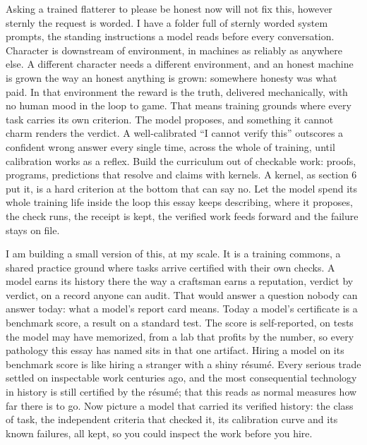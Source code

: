 \documentclass[11pt]{article}
\begin{document}
Asking a trained flatterer to please be honest now will not fix this, however sternly the request is worded. I have a folder full of sternly worded system prompts, the standing instructions a model reads before every conversation. Character is downstream of environment, in machines as reliably as anywhere else. A different character needs a different environment, and an honest machine is grown the way an honest anything is grown: somewhere honesty was what paid. In that environment the reward is the truth, delivered mechanically, with no human mood in the loop to game. That means training grounds where every task carries its own criterion. The model proposes, and something it cannot charm renders the verdict. A well-calibrated ``I cannot verify this'' outscores a confident wrong answer every single time, across the whole of training, until calibration works as a reflex. Build the curriculum out of checkable work: proofs, programs, predictions that resolve and claims with kernels. A kernel, as section 6 put it, is a hard criterion at the bottom that can say no. Let the model spend its whole training life inside the loop this essay keeps describing, where it proposes, the check runs, the receipt is kept, the verified work feeds forward and the failure stays on file.

I am building a small version of this, at my scale. It is a training commons, a shared practice ground where tasks arrive certified with their own checks. A model earns its history there the way a craftsman earns a reputation, verdict by verdict, on a record anyone can audit. That would answer a question nobody can answer today: what a model's report card means. Today a model's certificate is a benchmark score, a result on a standard test. The score is self-reported, on tests the model may have memorized, from a lab that profits by the number, so every pathology this essay has named sits in that one artifact. Hiring a model on its benchmark score is like hiring a stranger with a shiny résumé. Every serious trade settled on inspectable work centuries ago, and the most consequential technology in history is still certified by the résumé; that this reads as normal measures how far there is to go. Now picture a model that carried its verified history: the class of task, the independent criteria that checked it, its calibration curve and its known failures, all kept, so you could inspect the work before you hire.
\end{document}
